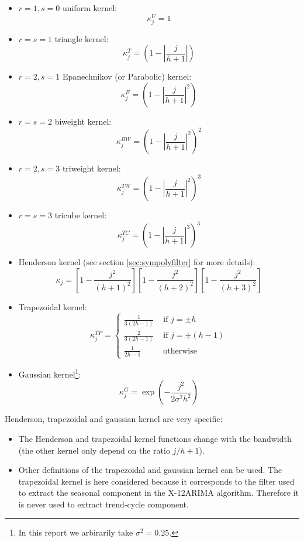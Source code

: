 \documentclass[
  12pt,
  ,
  a4paper]{article}
\newcommand\1{\mathds{1}}
\begin{document}
\begin{multicols}{2}

\begin{itemize}
\item
  \(r=1,s=0\) uniform kernel:
  \[\kappa_j^U=1\]
\item
  \(r=s=1\) triangle kernel:
  \[\kappa_j^T=\left(
  1-
  \left\lvert
  \frac j {h+1}
  \right\lvert
  \right)\]
\item
  \(r=2,s=1\) Epanechnikov (or Parabolic) kernel:
  \[\kappa_j^E=\left(
  1-
  \left\lvert
  \frac j {h+1}
  \right\lvert^2
  \right)\]
\item
  \(r=s=2\) biweight kernel:
  \[\kappa_j^{BW}=\left(
  1-
  \left\lvert
  \frac j {h+1}
  \right\lvert^2
  \right)^2\]
\item
  \(r = 2, s = 3\) triweight kernel:
  \[\kappa_j^{TW}=\left(
  1-
  \left\lvert
  \frac j {h+1}
  \right\lvert^2
  \right)^3\]
\item
  \(r = s = 3\) tricube kernel:
  \[\kappa_j^{TC}=\left(
  1-
  \left\lvert
  \frac j {h+1}
  \right\lvert^3
  \right)^3\]
\item
  Henderson kernel (see section \ref{sec:sympolyfilter} for more details):
  \[
  \kappa_{j}=\left[1-\frac{j^2}{(h+1)^2}\right]
  \left[1-\frac{j^2}{(h+2)^2}\right]
  \left[1-\frac{j^2}{(h+3)^2}\right]
  \]
\item
  Trapezoidal kernel:
  \[
  \kappa_j^{TP}=
  \begin{cases}
  \frac{1}{3(2h-1)} & \text{ if }j=\pm h 
  \\
  \frac{2}{3(2h-1)} & \text{ if }j=\pm (h-1)\\
  \frac{1}{2h-1}& \text{ otherwise}
  \end{cases}
  \]
\item
  Gaussian kernel\footnote{
    In this report we arbirarily take \(\sigma^2=0.25\).}:
  \[
  \kappa_j^G=\exp\left(
  -\frac{
  j^2
  }{
  2\sigma^2h^2
  }\right)
  \]
\end{itemize}

\end{multicols}

Henderson, trapezoidal and gaussian kernel are very specific:

\begin{itemize}
\item
  The Henderson and trapezoidal kernel functions change with the bandwidth (the other kernel only depend on the ratio \(j/h+1\)).
\item
  Other definitions of the trapezoidal and gaussian kernel can be used.
  The trapezoidal kernel is here considered because it corresponds to the filter used to extract the seasonal component in the X-12ARIMA algorithm.
  Therefore it is never used to extract trend-cycle component.
\end{itemize}
\end{document}
